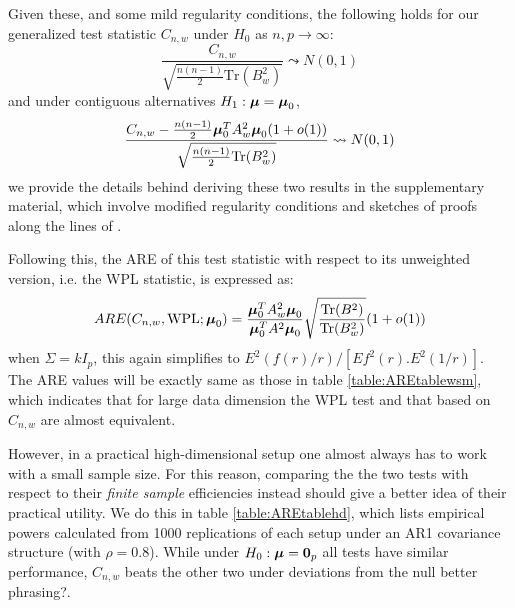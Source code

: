 \documentclass[fleqn,11pt]{article}
\begin{document}
Given these, and some mild regularity conditions, the following holds for our generalized test statistic $C_{n,w}$ under $H_0$ as $n,p \rightarrow \infty$:
%
\begin{equation}\label{eqn:hdtest1}
\frac{C_{n,w}}{\sqrt{\frac{n(n-1)}{2} \text{Tr}(B_w^2)}} \leadsto N(0,1)
\end{equation}
%
and under contiguous alternatives $H_1: {\boldsymbol{\mu}} = {\boldsymbol{\mu}}_0$,
%
\begin{equation}\label{eqn:hdtest2}
\frac{C_{n,w} - \frac{n(n-1)}{2} {\boldsymbol{\mu}}_0^T A_w^2 {\boldsymbol{\mu}}_0 (1 + o(1)) }{\sqrt{\frac{n(n-1)}{2} \text{Tr}(B_w^2)}} \leadsto N(0,1)
\end{equation}
%
we provide the details behind deriving these two results in the supplementary material, which involve modified regularity conditions and sketches of proofs along the lines of \cite{WangPengLi15}.

Following this, the ARE of this test statistic with respect to its unweighted version, i.e. the WPL statistic, is expressed as:
%
$$
ARE(C_{n,w}, \text{WPL}; {\boldsymbol{\mu}}_0) = \frac{{\boldsymbol{\mu}}_0^T A_w^2 {\boldsymbol{\mu}}_0}{{\boldsymbol{\mu}}_0^T A^2 {\boldsymbol{\mu}}_0} \sqrt\frac{\text{Tr}(B^2)}{\text{Tr}(B_w^2)} (1 + o(1))
$$
%
when $\Sigma = kI_p$, this again simplifies to $E^2(f(r)/r)/[E f^2(r). E^2(1/r)]$. The ARE values will be exactly same as those in table \ref{table:AREtablewsm}, which indicates that for large data dimension the WPL test and that based on $C_{n,w}$ are almost equivalent.

However, in a practical high-dimensional setup one almost always has to work with a small sample size. For this reason, comparing the the two tests with respect to their \textit{finite sample} efficiencies instead should give a better idea of their practical utility. We do this in table \ref{table:AREtablehd}, which lists empirical powers calculated from 1000 replications of each setup under an AR1 covariance structure (with $\rho = 0.8$). While under $H_0: {\boldsymbol{\mu}} = {\bf 0}_p$ all tests have similar performance, $C_{n,w}$ beats the other two under deviations from the null {\colrbf better phrasing?}.
\end{document}
